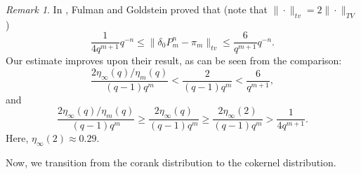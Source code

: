 \documentclass[a4]{amsart}
\theoremstyle{remark} \newtheorem{remark}[theorem]{Remark}
\begin{document}
\begin{remark}\label{rmk:comparetoFG15}
In \cite{fulman2015Steins}, Fulman and Goldstein proved that (note that $\|\cdot \|_{tv} = 2 \|\cdot \|_{TV}$)
\[
\frac{1}{4 q^{m + 1}} q^{-n} \leq \|\delta_0 P_m^n - \pi_m\|_{tv} \leq \frac{6}{q^{m + 1}} q^{-n}.
\]
Our estimate improves upon their result, as can be seen from the comparison:
\[
\frac{2 \eta_\infty(q) / \eta_m(q)}{(q - 1) q^m} < \frac{2}{(q - 1) q^m} < \frac{6}{q^{m + 1}},
\]
and
\[
\frac{2 \eta_\infty(q) / \eta_m(q)}{(q - 1) q^m} \geq \frac{2 \eta_\infty(q)}{(q - 1) q^m} \geq \frac{2 \eta_\infty(2)}{(q - 1) q^m} > \frac{1}{4 q^{m + 1}}.
\]
Here, $\eta_\infty(2) \approx 0.29$.
\end{remark}



\bigskip
Now, we transition from the corank distribution to the cokernel distribution.
\end{document}
